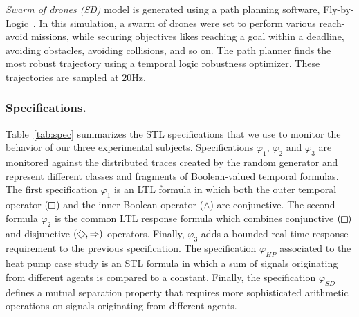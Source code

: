 \noindent \emph{Swarm of drones (SD)} model is generated using a path planning software, Fly-by-Logic~\cite{PantAM17CCTA}. In this simulation, a swarm of drones were set to perform various reach-avoid missions, while securing objectives likes reaching a goal within a deadline, avoiding obstacles, avoiding collisions, and so on. The path planner finds the most robust trajectory using a temporal logic robustness optimizer. These trajectories are sampled at 20Hz.

\subsubsection{Specifications.}

Table~\ref{tab:spec} summarizes the STL specifications that we use to monitor the behavior of our three experimental subjects. Specifications $\varphi_{1}$, $\varphi_{2}$ and $\varphi_{3}$ are monitored against the distributed traces created by the random generator and represent different classes and fragments of Boolean-valued temporal formulas. The first specification $\varphi_1$ is an LTL formula in which both the outer temporal operator ($\LTLg$) and the inner Boolean operator ($\wedge$) are conjunctive. The second formula $\varphi_2$ is the common LTL response formula which combines conjunctive $(\LTLg)$ and disjunctive $(\LTLf, \Rightarrow)$ operators. Finally, $\varphi_3$ adds a bounded real-time response requirement to the previous specification. The specification $\varphi_{HP}$ associated to the heat pump case study is an STL formula in which a sum of signals originating from different agents is compared to a constant. Finally, the specification $\varphi_{SD}$ defines a mutual separation property that requires more sophisticated arithmetic operations on signals originating from different agents.  

